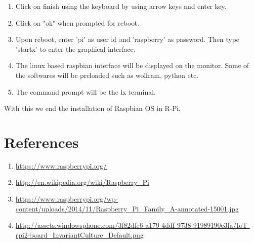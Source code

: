 \documentclass[11pt,a4paper]{report}
\begin{document}
\begin{enumerate}
\begin{itemize}
\begin{figure}[h!]
				\centering	
			\end{figure}
		\end{itemize}
	\newpage
	\item Click on finish using the keyboard by using arrow keys and enter key.
	\item Click on "ok" when prompted for reboot.
	\item Upon reboot, enter 'pi' as user id and 'raspberry' as password. Then type 'startx' to enter the graphical interface.
	\item The linux based raspbian interface will be displayed on the monitor. Some of the softwares will be preloaded such as wolfram, python etc.
	\item The command prompt will be the lx terminal.
	\end{enumerate}
	\flushleft
	With this we end the installation of Raspbian OS in R-Pi.
	\vspace{0.4cm} 
	\newpage
	\section{References}
	\begin{enumerate}
		\item \url{https://www.raspberrypi.org/}
		\item \url{http://en.wikipedia.org/wiki/Raspberry_Pi}	
		\item \url{https://www.raspberrypi.org/wp-content/uploads/2014/11/Raspberry_Pi_Family_A-annotated-15001.jpg}
		\item \url{http://assets.windowsphone.com/3f82dfe6-a179-4ddf-9738-91989190c3fa/IoT-rpi2-board_InvariantCulture_Default.png}	
	\end{enumerate}
\end{document}
